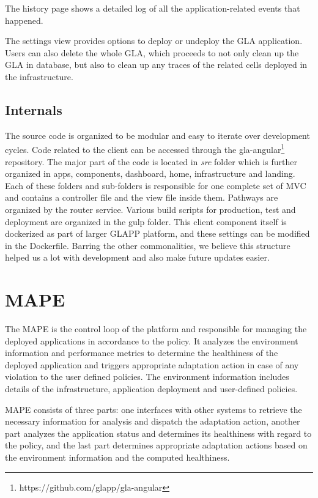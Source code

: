 \documentclass{seal_thesis}
\begin{document}
The history page shows a detailed log of all the application-related events that happened. 

The settings view provides options to deploy or undeploy the GLA application. 
Users can also delete the whole GLA, which proceeds to not only clean up the GLA in database, but also to clean up any traces of the related cells deployed in the infrastructure.

\subsection{Internals}

The source code is organized to be modular and easy to iterate over development cycles. 
Code related to the client can be accessed through the gla-angular\footnote{https://github.com/glapp/gla-angular} repository.
The major part of the code is located in \textit{src} folder which is further organized in apps, components, dashboard, home, infrastructure and landing. 
Each of these folders and sub-folders is responsible for one complete set of MVC and contains a controller file and the view file inside them. 
Pathways are organized by the router service. 
Various build scripts for production, test and deployment are organized in the gulp folder. 
This client component itself is dockerized as part of larger GLAPP platform, and these settings can be modified in the Dockerfile. 
Barring the other commonalities, we believe this structure helped us a lot with development and also make future updates easier.


\section{MAPE}
The MAPE is the control loop of the platform and responsible for managing the deployed applications in accordance to the policy.
It analyzes the environment information and performance metrics to determine the healthiness of the deployed application and triggers appropriate adaptation action in case of any violation to the user defined policies.
The environment information includes details of the infrastructure, application deployment and user-defined policies.

MAPE consists of three parts: one interfaces with other systems to retrieve the necessary information for analysis and dispatch the adaptation action, another part analyzes the application status and determines its healthiness with regard to the policy, and the last part determines appropriate adaptation actions based on the environment information and the computed healthiness.
\end{document}
